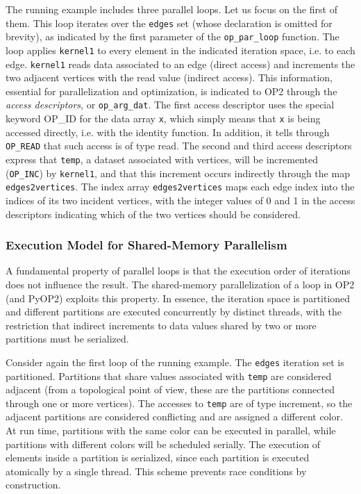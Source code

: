 The running example includes three parallel loops. Let us focus on the first of them. This loop iterates over the {\tt edges} set (whose declaration is omitted for brevity), as indicated by the first parameter of the {\tt op\_par\_loop} function. The loop applies {\tt kernel1} to every element in the indicated iteration space, i.e. to each edge. {\tt kernel1} reads data associated to an edge (direct access) and increments the two adjacent vertices with the read value (indirect access). This information, essential for parallelization and optimization, is indicated to OP2 through the {\em access descriptors}, or {\tt op\_arg\_dat}. The first access descriptor uses the special keyword OP\_ID for the data array {\tt x}, which simply means that {\tt x} is being accessed directly, i.e. with the identity function. In addition, it tells through {\tt OP\_READ} that such access is of type read. The second and third access descriptors express that {\tt temp}, a dataset associated with vertices, will be incremented ({\tt OP\_INC}) by {\tt kernel1}, and that this increment occurs indirectly through the map {\tt edges2vertices}. The index array {\tt edges2vertices} maps each edge index into the indices of its two incident vertices, with the integer values of 0 and 1 in the access descriptors indicating which of the two vertices should be considered.


\subsubsection{Execution Model for Shared-Memory Parallelism}
A fundamental property of parallel loops is that the execution order of iterations does not influence the result. The shared-memory parallelization of a loop in OP2 (and PyOP2) exploits this property. In essence, the iteration space is partitioned and different partitions are executed concurrently by distinct threads, with the restriction that indirect increments to data values shared by two or more partitions must be serialized.

Consider again the first loop of the running example. The {\tt edges} iteration set is partitioned. Partitions that share values associated with {\tt temp} are considered adjacent (from a topological point of view, these are the partitions connected through one or more vertices). The accesses to {\tt temp} are of type increment, so the adjacent partitions are considered conflicting and are assigned a different color. At run time, partitions with the same color can be executed in parallel, while partitions with different colors will be scheduled serially. The execution of elements inside a partition is serialized, since each partition is executed atomically by a single thread. This scheme prevents race conditions by construction. 

